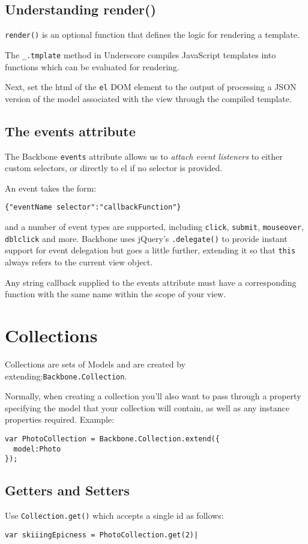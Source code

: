 \documentclass[a4paper, 11pt]{book}
\begin{document}
\subsection{Understanding render()}
\verb|render()| is an optional function that defines the logic for rendering a
template. 

The \verb|_.tmplate| method in Underscore compiles JavaScript templates into
functions which can be evaluated for rendering.

Next, set the html of the \verb|el| DOM element to the output of processing a
JSON version of the model associated with the view through the compiled
template.
\subsection{The events attribute}
The Backbone \verb|events| attribute allows us to \emph{attach event listeners}
to either custom selectors, or directly to el if no selector is provided. 

An event takes the form:
\begin{verbatim}
{"eventName selector":"callbackFunction"}
\end{verbatim}
and a number of event types are supported, including \verb|click|,
\verb|submit|, \verb|mouseover|, \verb|dblclick| and more.
Backbone uses jQuery's \verb|.delegate()| to provide instant support for event
delegation but goes a little further, extending it so that \verb|this| always
refers to the current view object. 

Any string callback supplied to the events attribute must have a corresponding
function with the same name within the scope of your view.
\section{Collections}
Collections are sets of Models and are created by
extending:\verb|Backbone.Collection|.

Normally, when creating a collection you'll also want to pass through a property
specifying the model that your collection will contain, as well as any instance
properties required. Example:
\begin{verbatim}
var PhotoCollection = Backbone.Collection.extend({
  model:Photo
});
\end{verbatim}

\subsection{Getters and Setters}
Use \verb|Collection.get()| which accepts a single id as follows:
\begin{verbatim}
var skiiingEpicness = PhotoCollection.get(2)|
\end{verbatim}
\end{document}
